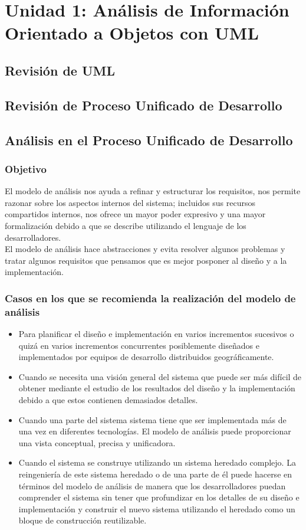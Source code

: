 \section{Unidad 1: Análisis de Información Orientado a Objetos con UML}

\subsection{Revisión de UML}
\subsection{Revisión de Proceso Unificado de Desarrollo}
\subsection{Análisis en el Proceso Unificado de Desarrollo}
\subsubsection{Objetivo}
El modelo de análisis nos ayuda a refinar y estructurar los requisitos, nos permite razonar sobre los aspectos internos del sistema; incluidos sus recursos compartidos internos, nos ofrece un mayor poder expresivo y una mayor formalización debido a que se describe utilizando el lenguaje de los desarrolladores.\\

El modelo de análisis hace abstracciones y evita resolver algunos problemas y tratar algunos requisitos que pensamos que es mejor posponer al diseño y a la implementación.

\subsubsection{Casos en los que se recomienda la realización del modelo de análisis}
\begin{itemize}
	\item Para planificar el diseño e implementación en varios incrementos sucesivos o quizá en varios incrementos concurrentes posiblemente diseñados e implementados por equipos de desarrollo distribuidos geográficamente.
	\item Cuando se necesita una visión general del sistema que puede ser más difícil de obtener mediante el estudio de los resultados del diseño y la implementación debido a que estos contienen demasiados detalles.
	\item Cuando una parte del sistema sistema tiene que ser implementada más de una vez en diferentes tecnologías. El modelo de análisis puede proporcionar una vista conceptual, precisa y unificadora.
	\item Cuando el sistema se construye utilizando un sistema heredado complejo. La reingeniería de este sistema heredado o de una parte de él puede hacerse en términos del modelo de análisis de manera que los desarrolladores puedan comprender el sistema sin tener que profundizar en los detalles de su diseño e implementación y construir el nuevo sistema utilizando el heredado como un bloque de construcción reutilizable.
\end{itemize}
